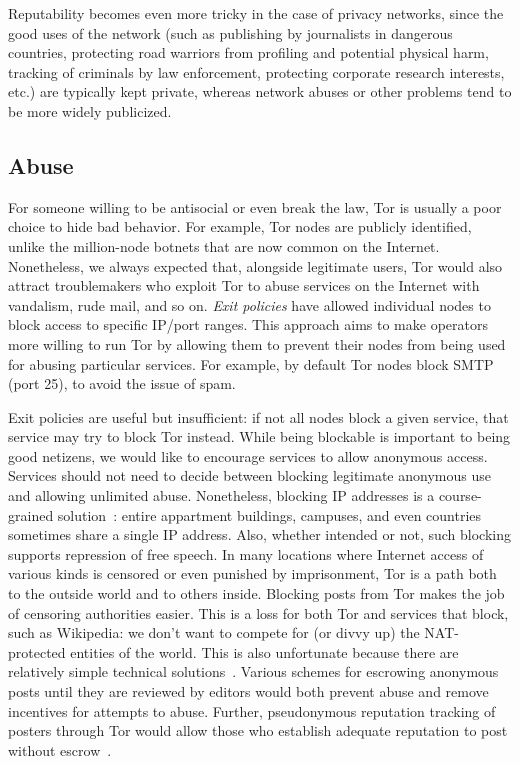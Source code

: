 \documentclass{llncs}
\begin{document}
Reputability becomes even more tricky in the case of privacy networks,
since the good uses of the network (such as publishing by journalists
in dangerous countries, protecting road warriors from profiling and
potential physical harm, tracking of criminals by law enforcement,
protecting corporate research interests, etc.) are typically kept private,
whereas network abuses or other problems tend to be more widely
publicized.


\subsection{Abuse}
\label{subsec:tor-and-blacklists}

For someone willing to be antisocial or even break the law, Tor is
usually a poor choice to hide bad behavior. For example, Tor nodes are
publicly identified, unlike the million-node botnets that are now
common on the Internet. Nonetheless, we always expected that,
alongside legitimate users, Tor would also attract troublemakers who
exploit Tor to abuse services on the Internet with vandalism, rude
mail, and so on.  \emph{Exit policies} have allowed individual nodes
to block access to specific IP/port ranges.  This approach aims to
make operators more willing to run Tor by allowing them to prevent
their nodes from being used for abusing particular services.  For
example, by default Tor nodes block SMTP (port 25), to avoid the issue
of spam.

Exit policies are useful but insufficient: if not all nodes block a
given service, that service may try to block Tor instead.  While being
blockable is important to being good netizens, we would like to
encourage services to allow anonymous access. Services should not need
to decide between blocking legitimate anonymous use and allowing
unlimited abuse.  Nonetheless, blocking IP addresses is a
course-grained solution~\cite{netauth}: entire appartment buildings,
campuses, and even countries sometimes share a single IP address.
Also, whether intended or not, such blocking supports repression of
free speech. In many locations where Internet access of various kinds
is censored or even punished by imprisonment, Tor is a path both to
the outside world and to others inside.  Blocking posts from Tor makes
the job of censoring authorities easier.  This is a loss for both Tor
and services that block, such as Wikipedia: we don't want to compete
for (or divvy up) the NAT-protected entities of the world.  This is
also unfortunate because there are relatively simple technical
solutions~\cite{nym}.  Various schemes for escrowing anonymous posts
until they are reviewed by editors would both prevent abuse and remove
incentives for attempts to abuse. Further, pseudonymous reputation
tracking of posters through Tor would allow those who establish
adequate reputation to post without escrow~\cite{nym,nymble}.
\end{document}
